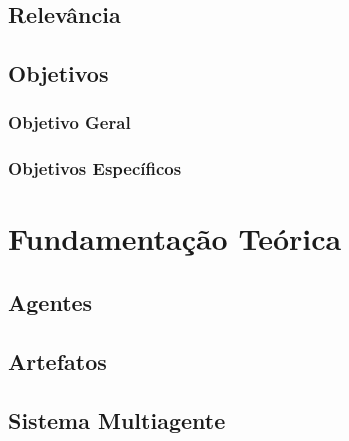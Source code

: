 \documentclass[openright]{normas-utf-tex} %
\begin{document}
		
	
	\section{Relevância}

		

	\section{Objetivos}

		

		\subsection{Objetivo Geral}

			
			
		\subsection{Objetivos Específicos}

			



\chapter{Fundamentação Teórica}
\label{chap:fundteoric}

	\section{Agentes}

		

	\section{Artefatos}

		
 
	\section{Sistema Multiagente}

		
\end{document}
